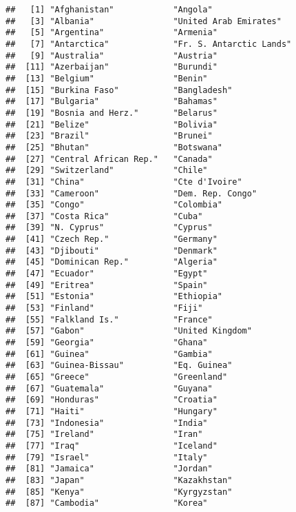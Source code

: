 \documentclass[]{article}
\begin{document}
\begin{verbatim}
##   [1] "Afghanistan"            "Angola"                
##   [3] "Albania"                "United Arab Emirates"  
##   [5] "Argentina"              "Armenia"               
##   [7] "Antarctica"             "Fr. S. Antarctic Lands"
##   [9] "Australia"              "Austria"               
##  [11] "Azerbaijan"             "Burundi"               
##  [13] "Belgium"                "Benin"                 
##  [15] "Burkina Faso"           "Bangladesh"            
##  [17] "Bulgaria"               "Bahamas"               
##  [19] "Bosnia and Herz."       "Belarus"               
##  [21] "Belize"                 "Bolivia"               
##  [23] "Brazil"                 "Brunei"                
##  [25] "Bhutan"                 "Botswana"              
##  [27] "Central African Rep."   "Canada"                
##  [29] "Switzerland"            "Chile"                 
##  [31] "China"                  "Cte d'Ivoire"          
##  [33] "Cameroon"               "Dem. Rep. Congo"       
##  [35] "Congo"                  "Colombia"              
##  [37] "Costa Rica"             "Cuba"                  
##  [39] "N. Cyprus"              "Cyprus"                
##  [41] "Czech Rep."             "Germany"               
##  [43] "Djibouti"               "Denmark"               
##  [45] "Dominican Rep."         "Algeria"               
##  [47] "Ecuador"                "Egypt"                 
##  [49] "Eritrea"                "Spain"                 
##  [51] "Estonia"                "Ethiopia"              
##  [53] "Finland"                "Fiji"                  
##  [55] "Falkland Is."           "France"                
##  [57] "Gabon"                  "United Kingdom"        
##  [59] "Georgia"                "Ghana"                 
##  [61] "Guinea"                 "Gambia"                
##  [63] "Guinea-Bissau"          "Eq. Guinea"            
##  [65] "Greece"                 "Greenland"             
##  [67] "Guatemala"              "Guyana"                
##  [69] "Honduras"               "Croatia"               
##  [71] "Haiti"                  "Hungary"               
##  [73] "Indonesia"              "India"                 
##  [75] "Ireland"                "Iran"                  
##  [77] "Iraq"                   "Iceland"               
##  [79] "Israel"                 "Italy"                 
##  [81] "Jamaica"                "Jordan"                
##  [83] "Japan"                  "Kazakhstan"            
##  [85] "Kenya"                  "Kyrgyzstan"            
##  [87] "Cambodia"               "Korea"                 

\end{verbatim}
\end{document}
